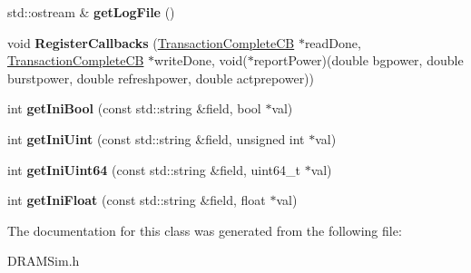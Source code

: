 \begin{DoxyCompactItemize}
\item 
\hypertarget{classDRAMSim_1_1MultiChannelMemorySystem_a2eaa2a69977d4001a416935b6cd467c4}{std\-::ostream \& {\bfseries get\-Log\-File} ()}\label{classDRAMSim_1_1MultiChannelMemorySystem_a2eaa2a69977d4001a416935b6cd467c4}

\item 
\hypertarget{classDRAMSim_1_1MultiChannelMemorySystem_a6975c41033ba1a7bde6ef38396c6a78f}{void {\bfseries Register\-Callbacks} (\hyperlink{classDRAMSim_1_1CallbackBase}{Transaction\-Complete\-C\-B} $\ast$read\-Done, \hyperlink{classDRAMSim_1_1CallbackBase}{Transaction\-Complete\-C\-B} $\ast$write\-Done, void($\ast$report\-Power)(double bgpower, double burstpower, double refreshpower, double actprepower))}\label{classDRAMSim_1_1MultiChannelMemorySystem_a6975c41033ba1a7bde6ef38396c6a78f}

\item 
\hypertarget{classDRAMSim_1_1MultiChannelMemorySystem_a4c5eb07d4fa299d0e0fad2613581d8b1}{int {\bfseries get\-Ini\-Bool} (const std\-::string \&field, bool $\ast$val)}\label{classDRAMSim_1_1MultiChannelMemorySystem_a4c5eb07d4fa299d0e0fad2613581d8b1}

\item 
\hypertarget{classDRAMSim_1_1MultiChannelMemorySystem_af15dbcd0a969d5f23192f34315f3244a}{int {\bfseries get\-Ini\-Uint} (const std\-::string \&field, unsigned int $\ast$val)}\label{classDRAMSim_1_1MultiChannelMemorySystem_af15dbcd0a969d5f23192f34315f3244a}

\item 
\hypertarget{classDRAMSim_1_1MultiChannelMemorySystem_a8eeb931b72614e31edf5a4ef921df1b1}{int {\bfseries get\-Ini\-Uint64} (const std\-::string \&field, uint64\-\_\-t $\ast$val)}\label{classDRAMSim_1_1MultiChannelMemorySystem_a8eeb931b72614e31edf5a4ef921df1b1}

\item 
\hypertarget{classDRAMSim_1_1MultiChannelMemorySystem_ac7fa1f870d6bce544d545d05faaef290}{int {\bfseries get\-Ini\-Float} (const std\-::string \&field, float $\ast$val)}\label{classDRAMSim_1_1MultiChannelMemorySystem_ac7fa1f870d6bce544d545d05faaef290}

\end{DoxyCompactItemize}


The documentation for this class was generated from the following file\-:\begin{DoxyCompactItemize}
\item 
D\-R\-A\-M\-Sim.\-h\end{DoxyCompactItemize}
